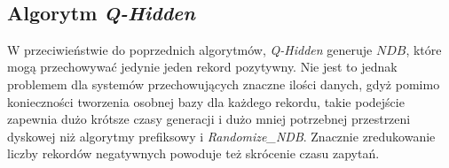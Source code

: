 \pagebreak
~~~
\pagebreak

\subsection{Algorytm \textit{Q-Hidden}}
W przeciwieństwie do poprzednich algorytmów, \textit{Q-Hidden} generuje $NDB$, które mogą przechowywać jedynie jeden rekord pozytywny. Nie jest to jednak problemem dla systemów przechowujących znaczne ilości danych, gdyż
pomimo konieczności tworzenia osobnej bazy dla każdego rekordu, takie podejście zapewnia dużo krótsze czasy generacji i dużo mniej potrzebnej przestrzeni dyskowej niż algorytmy prefiksowy i \textit{Randomize\_NDB}.
Znacznie zredukowanie liczby rekordów negatywnych powoduje też skrócenie czasu zapytań.


